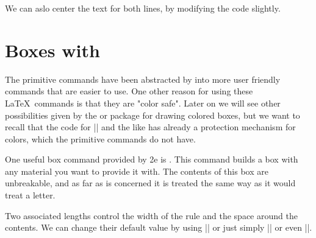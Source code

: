 {\mbox{}
 
\noindent
{}%



\noindent
{}%

We can aslo center the text for both lines, by modifying the code slightly.
\begin{teX}
\noindent
{}%
\end{teX}


\noindent
{}%



\chapter{Boxes with \protect\LaTeXe}

The \tex primitive commands have been abstracted by \latexe into more user friendly commands that are easier to use. One other reason for using these \LaTeX\ commands is that they are "color safe". Later on we will see other possibilities given by the  or  package for drawing colored boxes, but we want to recall that the code for |\makebox| and the like has already a protection mechanism for colors, which the primitive commands do not have.

\begin{macro}{\framebox} 
One useful box command provided by \latex2e is \cmd{\framebox}. This command builds a box with any material you want to provide it with. The contents of this box are unbreakable, and as far as \tex is concerned it is treated the same way as it would treat a letter. 
\end{macro}
\begin{macro}{\fboxsep}
\begin{macro}{\fboxrule}
Two associated lengths control the width of the rule and the space around the contents. We can change their default value by using |\setlength{\fboxsep}{0pt}| or just simply |\fboxsep=0pt| or even ||. 
\end{macro}
\end{macro}

}
